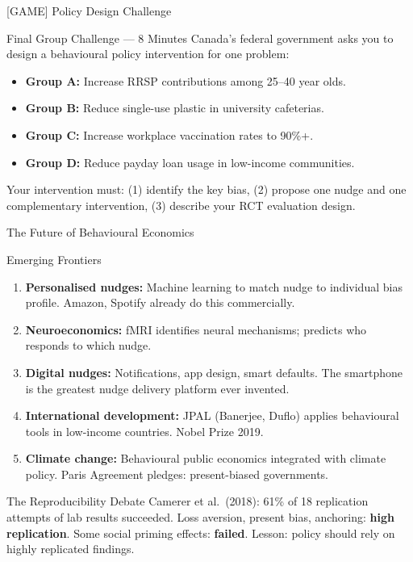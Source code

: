 \documentclass[aspectratio=169]{beamer}
\begin{document}
\begin{frame}{[GAME] Policy Design Challenge}
\begin{alertblock}{Final Group Challenge --- 8 Minutes}
Canada's federal government asks you to design a behavioural policy intervention for one problem:
\begin{itemize}
  \item \textbf{Group A:} Increase RRSP contributions among 25--40 year olds.
  \item \textbf{Group B:} Reduce single-use plastic in university cafeterias.
  \item \textbf{Group C:} Increase workplace vaccination rates to 90\%+.
  \item \textbf{Group D:} Reduce payday loan usage in low-income communities.
\end{itemize}
Your intervention must: (1) identify the key bias, (2) propose one nudge and one complementary intervention, (3) describe your RCT evaluation design.
\end{alertblock}
\end{frame}

\begin{frame}{The Future of Behavioural Economics}
\begin{block}{Emerging Frontiers}
\begin{enumerate}
  \item \textbf{Personalised nudges:} Machine learning to match nudge to individual bias profile. Amazon, Spotify already do this commercially.
  \item \textbf{Neuroeconomics:} fMRI identifies neural mechanisms; predicts who responds to which nudge.
  \item \textbf{Digital nudges:} Notifications, app design, smart defaults. The smartphone is the greatest nudge delivery platform ever invented.
  \item \textbf{International development:} JPAL (Banerjee, Duflo) applies behavioural tools in low-income countries. Nobel Prize 2019.
  \item \textbf{Climate change:} Behavioural public economics integrated with climate policy. Paris Agreement pledges: present-biased governments.
\end{enumerate}
\end{block}
\begin{exampleblock}{The Reproducibility Debate}
Camerer et al.\ (2018): 61\% of 18 replication attempts of lab results succeeded. Loss aversion, present bias, anchoring: \textbf{high replication}. Some social priming effects: \textbf{failed}. Lesson: policy should rely on highly replicated findings.
\end{exampleblock}
\end{frame}
\end{document}
